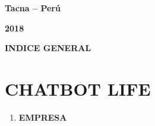 \documentclass[12pt]{report}
\begin{document}
\vspace{\baselineskip}

\vspace{\baselineskip}
\begin{Center}
{\fontsize{16pt}{19.2pt}\selectfont \textbf{Tacna – Perú}\par}
\end{Center}\par

\begin{Center}
{\fontsize{16pt}{19.2pt}\selectfont \textbf{2018}\par}
\end{Center}\par


\vspace{\baselineskip}
\setlength{\parskip}{9.96pt}



\newpage

\vspace{\baselineskip}\setlength{\parskip}{0.0pt}
\begin{Center}
\textbf{INDICE GENERAL}
\end{Center}\par


\vspace{\baselineskip}



\tableofcontents
{}

\vspace{\baselineskip}\setlength{\parskip}{9.96pt}



\newpage

\vspace{\baselineskip}\section*{CHATBOT LIFE}
\setlength{\parskip}{0.0pt}
\begin{enumerate}
	\item \textbf{EMPRESA}
\end{enumerate}\par
\end{document}
